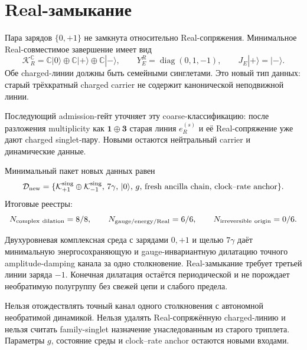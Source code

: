 \section{Real-замыкание}

Пара зарядов $\{0,+1\}$ не замкнута относительно Real-сопряжения.
Минимальное Real-совместимое завершение имеет вид
\begin{equation}
 \mathcal K_R^{\mathbb C}=\mathbb C|0\rangle\oplus
 \mathbb C|+\rangle\oplus\mathbb C|-\rangle,\qquad
 Y_E^R=\operatorname{diag}(0,1,-1),\qquad J_E|+\rangle=|-\rangle.
 \label{eq:v8-charged-mediator-real-completion}
\end{equation}
Обе charged-линии должны быть семейными синглетами. Это новый тип данных:
старый трёхкратный charged carrier не содержит канонической неподвижной
линии.

\begin{remark}
Последующий admission-гейт уточняет эту coarse-классификацию: после
разложения multiplicity как $\mathbf1\oplus\mathbf3$ старая линия
$e_R^{(s)}$ и её Real-сопряжение уже дают charged singlet-пару. Новыми
остаются нейтральный carrier и динамические данные.
\end{remark}

Минимальный пакет новых данных равен
\begin{equation}
 \mathcal D_{\rm new}=\{\mathcal K_{+1}^{\rm sing}\oplus
 \mathcal K_{-1}^{\rm sing},\,7\gamma,\,|0\rangle,\,g,\,
 \text{fresh ancilla chain},\,\text{clock--rate anchor}\}.
 \label{eq:v8-charged-mediator-new-data}
\end{equation}
Итоговые реестры:
\begin{equation}
 N_{\rm complex\ dilation}=8/8,\qquad
 N_{\rm gauge/energy/Real}=6/6,\qquad
 N_{\rm irreversible\ origin}=0/6.
 \label{eq:v8-charged-mediator-ledgers}
\end{equation}

\begin{theorem}
Двухуровневая комплексная среда с зарядами $0,+1$ и щелью $7\gamma$
даёт минимальную энергосохраняющую и gauge-инвариантную дилатацию точного
amplitude-damping канала за одно столкновение. Real-замыкание требует
третьей линии заряда $-1$. Конечная дилатация остаётся периодической и не
порождает необратимую полугруппу без свежей цепи и слабого предела.
\end{theorem}

\begin{nogocriterion}
Нельзя отождествлять точный канал одного столкновения с автономной
необратимой динамикой. Нельзя удалять Real-сопряжённую charged-линию и
нельзя считать family-singlet назначение унаследованным из старого
триплета. Параметры $g$, состояние среды и clock--rate anchor остаются
новыми входами.
\end{nogocriterion}

